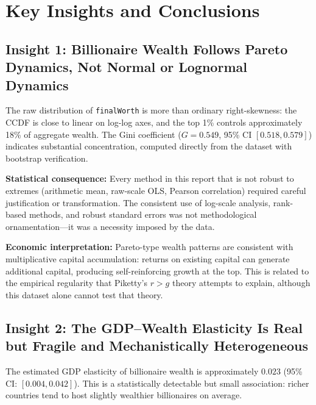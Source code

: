 \documentclass[a4paper,10pt]{article}
\begin{document}
\bigskip

\section{Key Insights and Conclusions}\label{sec:insights}

\subsection{Insight 1: Billionaire Wealth Follows Pareto Dynamics, Not Normal or Lognormal Dynamics}
The raw distribution of \texttt{finalWorth} is more than ordinary right-skewness: the CCDF is close to linear on log-log axes, and the top 1\% controls approximately 18\% of aggregate wealth. The Gini coefficient ($G = 0.549$, 95\% CI $[0.518, 0.579]$) indicates substantial concentration, computed directly from the dataset with bootstrap verification.

\textbf{Statistical consequence:} Every method in this report that is not robust to extremes (arithmetic mean, raw-scale OLS, Pearson correlation) required careful justification or transformation. The consistent use of log-scale analysis, rank-based methods, and robust standard errors was not methodological ornamentation---it was a necessity imposed by the data.

\textbf{Economic interpretation:} Pareto-type wealth patterns are consistent with multiplicative capital accumulation: returns on existing capital can generate additional capital, producing self-reinforcing growth at the top. This is related to the empirical regularity that Piketty's $r > g$ theory \cite{piketty2014} attempts to explain, although this dataset alone cannot test that theory.

\bigskip

\subsection{Insight 2: The GDP--Wealth Elasticity Is Real but Fragile and Mechanistically Heterogeneous}
The estimated GDP elasticity of billionaire wealth is approximately $0.023$ (95\% CI: $[0.004, 0.042]$). This is a statistically detectable but small association: richer countries tend to host slightly wealthier billionaires on average.
\end{document}

